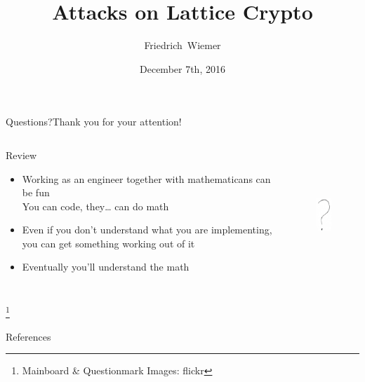 \documentclass[12pt,mathserif,professionalfont]{beamer}
\title{Attacks on Lattice Crypto}
\subtitle{}
\author[Friedrich~Wiemer]{Friedrich~Wiemer}
\institute{%
    FluxFingers\\[0.5em]
    Workgroup Symmetric Cryptography\\
    Ruhr University Bochum
}
\date{December 7th, 2016}
\newcommand{\blfootnote}[1]{%
    \begingroup
        \renewcommand\thefootnote{}\footnote{#1}%
        \addtocounter{footnote}{-1}%
    \endgroup
}
\begin{document}
\begin{frame}
    \titlepage{}
\end{frame}




\begin{frame}{Questions?}{Thank you for your attention!}
    \begin{columns}
        \begin{column}{0.58\textwidth}
            \begin{block}{Review}
                \begin{itemize}
                    \item Working as an engineer together with mathematicans can be fun\\
                        You can code, they\ldots{} can do math \Smiley{}
                    \item Even if you don't understand what you are implementing, you can get something working out of it
                    \item Eventually you'll understand the math \Ninja{}
                \end{itemize}
            \end{block}
        \end{column}
        \begin{column}{0.38\textwidth}
            \begin{figure}[!htb]
                \includegraphics[height=50mm]{data/flickr/questionmark.png}
            \end{figure}
        \end{column}
    \end{columns}\blfootnote{\scriptsize Mainboard \& Questionmark Images: flickr}
\end{frame}

\begin{frame}[allowframebreaks]{References}
    \tiny
    \printbibliography{}
\end{frame}
\end{document}

